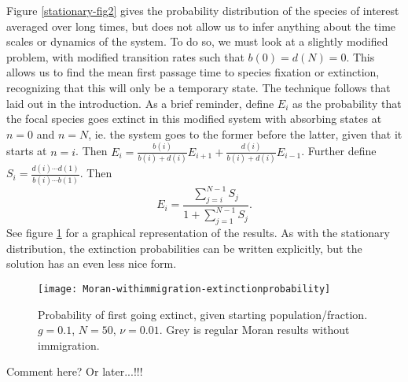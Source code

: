 Figure \ref{stationary-fig2} gives the probability distribution of the species of interest averaged over long times, but does not allow us to infer anything about the time scales or dynamics of the system. 
To do so, we must look at a slightly modified problem, with modified transition rates such that $b(0)=d(N)=0$. 
This allows us to find the mean first passage time to species fixation or extinction, recognizing that this will only be a temporary state. 
The technique follows that laid out in the introduction. 
As a brief reminder, define $E_i$ as the probability that the focal species goes extinct in this modified system with absorbing states at $n=0$ and $n=N$, ie. the system goes to the former before the latter, given that it starts at $n=i$. 
Then $E_i = \frac{b(i)}{b(i)+d(i)}E_{i+1} + \frac{d(i)}{b(i)+d(i)}E_{i-1}$. 
Further define $S_i = \frac{d(i)\cdots d(1)}{b(i)\cdots b(1)}$. 
Then 
\begin{equation} \label{extnprob}
E_{i} = \frac{\sum_{j=i}^{N-1}S_j}{1+\sum_{j=1}^{N-1}S_j}. 
\end{equation}
See figure \ref{extnprobfig} for a graphical representation of the results. 
As with the stationary distribution, the extinction probabilities can be written explicitly, but the solution has an even less nice form. 
\begin{figure}[ht]
	\centering
	\texttt{[image: Moran-withimmigration-extinctionprobability]}
	\caption{Probability of first going extinct, given starting population/fraction. $g=0.1$, $N=50$, $\nu=0.01$. Grey is regular Moran results without immigration. } \label{extnprobfig}
\end{figure}
Comment here? Or later...!!!


